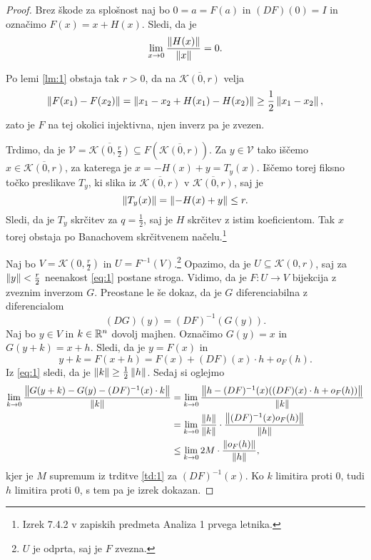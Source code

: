 \begin{proof}
Brez škode za splošnost naj bo $0 = a = F(a)$ in $(DF)(0) = I$ in
označimo $F(x) = x + H(x)$. Sledi, da je
\[
\lim_{x \to 0}\frac{\left\lVert H(x)\right\rVert}{\left\lVert x\right\rVert} = 0.
\]

Po lemi \ref{lm:1} obstaja tak $r>0$, da na
$\overline{\mathcal{K}(0,r)}$ velja
\begin{equation}\label{eq:1}
\left\lVert F(x_1) - F(x_2)\right\rVert =
\left\lVert x_1 - x_2 + H(x_1) - H(x_2)\right\rVert \geq
\frac{1}{2} \left\lVert x_1 - x_2\right\rVert,
\end{equation}
zato je $F$ na tej okolici injektivna, njen inverz pa je zvezen.

Trdimo, da je
$\mathcal{V} = \overline{\mathcal{K}\left(0,\frac{r}{2}\right)}
\subseteq F(\overline{\mathcal{K}(0,r)})$. Za
$y \in \mathcal{V}$ tako iščemo
$x \in \overline{\mathcal{K}(0,r)}$, za katerega je
$x = -H(x) + y = T_y(x)$. Iščemo torej fiksno točko preslikave
$T_y$, ki slika iz $\overline{\mathcal{K}(0,r)}$ v
$\overline{\mathcal{K}(0,r)}$, saj je
\[
\left\lVert T_y(x)\right\rVert = \left\lVert -H(x) + y\right\rVert \leq r.
\]
Sledi, da je $T_y$ skrčitev za $q=\frac{1}{2}$, saj je $H$ skrčitev
z istim koeficientom. Tak $x$ torej obstaja po Banachovem
skrčitvenem načelu.\footnote{Izrek 7.4.2 v zapiskih predmeta
Analiza 1 prvega letnika.}

Naj bo $V = \mathcal{K}\left(0,\frac{r}{2}\right)$ in
$U = F^{-1}(V)$.\footnote{$U$ je odprta, saj je $F$ zvezna.}
Opazimo, da je $U \subseteq \mathcal{K}(0,r)$, saj za
$\left\lVert y\right\rVert < \frac{r}{2}$ neenakost \eqref{eq:1} postane stroga.
Vidimo, da je $F \colon U \to V$ bijekcija z zveznim inverzom $G$.
Preostane le še dokaz, da je $G$ diferenciabilna z diferencialom
\[
(DG)(y) = (DF)^{-1}(G(y)).
\]
Naj bo $y \in V$ in $k \in \mathbb{R}^n$ dovolj majhen. Označimo $G(y) = x$
in $G(y + k) = x + h$. Sledi, da je $y = F(x)$ in
\[
y + k = F(x + h) = F(x) + (DF)(x)\cdot h + o_F(h).
\]
Iz \eqref{eq:1} sledi, da je
$\left\lVert k\right\rVert \geq \frac{1}{2} \left\lVert h\right\rVert$. Sedaj si oglejmo
\begin{align*}
\lim_{k \to 0}
\frac{\left\lVert G(y+k) - G(y) - (DF)^{-1}(x) \cdot k\right\rVert}{\left\lVert k\right\rVert}
&= \lim_{k \to 0}
\frac{\left\lVert h - (DF)^{-1}(x)((DF)(x)\cdot h + o_F(h))\right\rVert}{\left\lVert k\right\rVert}
\\
&= \lim_{k \to 0}
\frac{\left\lVert h\right\rVert}{\left\lVert k\right\rVert} \cdot
\frac{\left\lVert (DF)^{-1}(x)o_F(h)\right\rVert}{\left\lVert h\right\rVert}
\\
&\leq \lim_{k \to 0} 2M \cdot \frac{\left\lVert o_F(h)\right\rVert}{\left\lVert h\right\rVert},
\end{align*}
kjer je $M$ supremum iz trditve \ref{td:1} za $(DF)^{-1}(x)$. Ko
$k$ limitira proti $0$, tudi $h$ limitira proti $0$, s tem pa je
izrek dokazan.
\end{proof}

